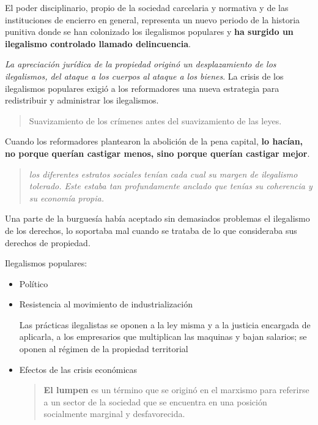 \documentclass[
  letterpaper,
  DIV=11,
  numbers=noendperiod]{scrreprt}
\begin{document}
El poder disciplinario, propio de la sociedad carcelaria y normativa y
de las instituciones de encierro en general, representa un nuevo periodo
de la historia punitiva donde se han colonizado los ilegalismos
populares y \textbf{ha surgido un ilegalismo controlado llamado
delincuencia}.

\emph{La apreciación jurídica de la propiedad originó un desplazamiento
de los ilegalismos, del ataque a los cuerpos al ataque a los bienes}. La
crisis de los ilegalismos populares exigió a los reformadores una nueva
estrategia para redistribuir y administrar los ilegalismos.

\begin{quote}
Suavizamiento de los crímenes antes del suavizamiento de las leyes.
\end{quote}

Cuando los reformadores plantearon la abolición de la pena capital,
\textbf{lo hacían, no porque querían castigar menos, sino porque querían
castigar mejor}.

\begin{quote}
\emph{los diferentes estratos sociales tenían cada cual su margen de
ilegalismo tolerado. Este estaba tan profundamente anclado que tenías su
coherencia y su economía propia.}
\end{quote}

Una parte de la burguesía había aceptado sin demasiados problemas el
ilegalismo de los derechos, lo soportaba mal cuando se trataba de lo que
consideraba sus derechos de propiedad.

Ilegalismos populares:

\begin{itemize}
\item
  Político
\item
  Resistencia al movimiento de industrialización

  Las prácticas ilegalistas se oponen a la ley misma y a la justicia
  encargada de aplicarla, a los empresarios que multiplican las maquinas
  y bajan salarios; se oponen al régimen de la propiedad territorial
\item
  Efectos de las crisis económicas

  \begin{quote}
  \textbf{El lumpen} es un término que se originó en el marxismo para
  referirse a un sector de la sociedad que se encuentra en una posición
  socialmente marginal y desfavorecida.
  \end{quote}
\end{itemize}
\end{document}
